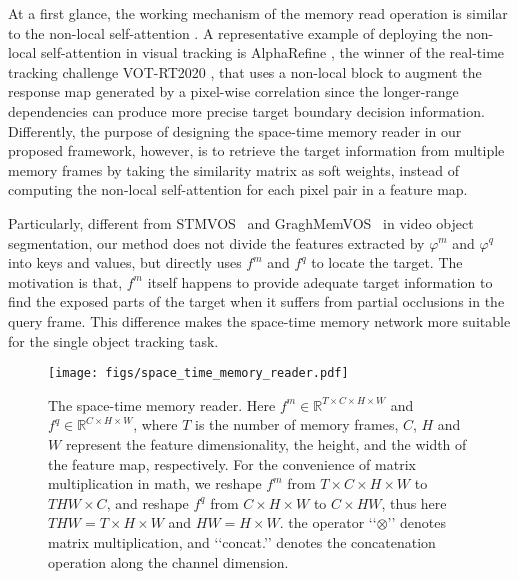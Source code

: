 \documentclass[final]{cvpr}
\begin{document}
At a first glance, the working mechanism of the memory read operation is similar to the non-local self-attention \cite{wang2018non}.
A representative example of deploying the non-local self-attention \cite{wang2018non} in visual tracking is AlphaRefine \cite{yan2020alpha}, the winner of the real-time tracking challenge VOT-RT2020 \cite{Kristan2020a}, that uses a non-local block to augment the response map generated by a pixel-wise correlation since the longer-range dependencies can produce more precise target boundary decision information.
Differently, the purpose of designing the space-time memory reader in our proposed framework, however, is to retrieve the target information from multiple memory frames by taking the similarity matrix as soft weights, instead of computing the non-local self-attention for each pixel pair in a feature map.
\par
Particularly, different from STMVOS~\cite{miller2016key} and GraghMemVOS~\cite{oh2019video} in video object segmentation, our method does not divide the features extracted by $\varphi^{m}$ and $\varphi^{q}$ into keys and values, but directly uses $f^{m}$ and $f^{q}$ to locate the target. The motivation is that, $f^{m}$ itself happens to provide adequate target information to find the exposed parts of the target when it suffers from partial occlusions in the query frame.
This difference makes the space-time memory network more suitable for the single object tracking task.

\begin{figure}[t]
    \centering
    \texttt{[image: figs/space\_time\_memory\_reader.pdf]}
    \vspace{-1.0em}
    \caption{The space-time memory reader. Here $f^{m} \in \mathbb{R}^{T \times C \times H \times W}$ and $f^{q} \in \mathbb{R}^{C \times H \times W}$, where $T$ is the number of memory frames, $C$, $H$ and $W$ represent the feature dimensionality, the height, and the width of the feature map, respectively. For the convenience of matrix multiplication in math, we reshape $f^{m}$ from $T \times C \times H \times W$ to $THW \times C$, and reshape $f^{q}$ from $C \times H \times W$ to $C \times HW$, thus here $THW = T \times H \times W$ and $HW = H \times W$. the operator \lq\lq{$\otimes$}\rq\rq{} denotes matrix multiplication, and \lq\lq{concat.}\rq\rq{} denotes the concatenation operation along the channel dimension.}
    \label{fig:memory_reader_fig}
 \vspace{-1.0em}
\end{figure}
\end{document}
